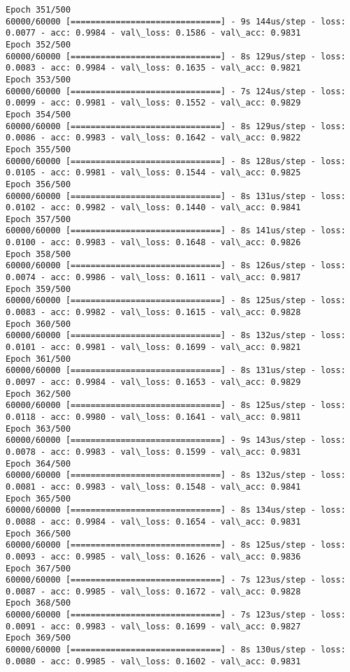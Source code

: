 \documentclass[11pt]{article}
\begin{document}
\begin{Verbatim}[commandchars=\\\{\}]
Epoch 351/500
60000/60000 [==============================] - 9s 144us/step - loss: 0.0077 - acc: 0.9984 - val\_loss: 0.1586 - val\_acc: 0.9831
Epoch 352/500
60000/60000 [==============================] - 8s 129us/step - loss: 0.0083 - acc: 0.9984 - val\_loss: 0.1635 - val\_acc: 0.9821
Epoch 353/500
60000/60000 [==============================] - 7s 124us/step - loss: 0.0099 - acc: 0.9981 - val\_loss: 0.1552 - val\_acc: 0.9829
Epoch 354/500
60000/60000 [==============================] - 8s 129us/step - loss: 0.0086 - acc: 0.9983 - val\_loss: 0.1642 - val\_acc: 0.9822
Epoch 355/500
60000/60000 [==============================] - 8s 128us/step - loss: 0.0105 - acc: 0.9981 - val\_loss: 0.1544 - val\_acc: 0.9825
Epoch 356/500
60000/60000 [==============================] - 8s 131us/step - loss: 0.0102 - acc: 0.9982 - val\_loss: 0.1440 - val\_acc: 0.9841
Epoch 357/500
60000/60000 [==============================] - 8s 141us/step - loss: 0.0100 - acc: 0.9983 - val\_loss: 0.1648 - val\_acc: 0.9826
Epoch 358/500
60000/60000 [==============================] - 8s 126us/step - loss: 0.0074 - acc: 0.9986 - val\_loss: 0.1611 - val\_acc: 0.9817
Epoch 359/500
60000/60000 [==============================] - 8s 125us/step - loss: 0.0083 - acc: 0.9982 - val\_loss: 0.1615 - val\_acc: 0.9828
Epoch 360/500
60000/60000 [==============================] - 8s 132us/step - loss: 0.0101 - acc: 0.9981 - val\_loss: 0.1699 - val\_acc: 0.9821
Epoch 361/500
60000/60000 [==============================] - 8s 131us/step - loss: 0.0097 - acc: 0.9984 - val\_loss: 0.1653 - val\_acc: 0.9829
Epoch 362/500
60000/60000 [==============================] - 8s 125us/step - loss: 0.0118 - acc: 0.9980 - val\_loss: 0.1641 - val\_acc: 0.9811
Epoch 363/500
60000/60000 [==============================] - 9s 143us/step - loss: 0.0078 - acc: 0.9983 - val\_loss: 0.1599 - val\_acc: 0.9831
Epoch 364/500
60000/60000 [==============================] - 8s 132us/step - loss: 0.0081 - acc: 0.9983 - val\_loss: 0.1548 - val\_acc: 0.9841
Epoch 365/500
60000/60000 [==============================] - 8s 134us/step - loss: 0.0088 - acc: 0.9984 - val\_loss: 0.1654 - val\_acc: 0.9831
Epoch 366/500
60000/60000 [==============================] - 8s 125us/step - loss: 0.0093 - acc: 0.9985 - val\_loss: 0.1626 - val\_acc: 0.9836
Epoch 367/500
60000/60000 [==============================] - 7s 123us/step - loss: 0.0087 - acc: 0.9985 - val\_loss: 0.1672 - val\_acc: 0.9828
Epoch 368/500
60000/60000 [==============================] - 7s 123us/step - loss: 0.0091 - acc: 0.9983 - val\_loss: 0.1699 - val\_acc: 0.9827
Epoch 369/500
60000/60000 [==============================] - 8s 130us/step - loss: 0.0080 - acc: 0.9985 - val\_loss: 0.1602 - val\_acc: 0.9831

\end{Verbatim}
\end{document}

